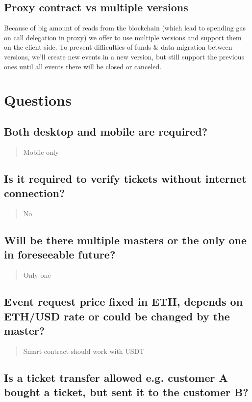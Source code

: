 \documentclass[11pt]{article}
\begin{document}
\subsection{Proxy contract vs multiple versions}
\label{sec:org36915b4}

Because of big amount of reads from the blockchain (which lead to spending gas on call delegation in proxy) we offer to use multiple versions and support them on the client side. To prevent difficulties of funds \& data migration between versions, we'll create new events in a new version, but still support the previous ones until all events there will be closed or canceled.
\section{Questions}
\label{sec:org047244f}

\subsection{Both desktop and mobile are required?}
\label{sec:org72f3a1a}

\begin{quote}
Mobile only
\end{quote}
\subsection{Is it required to verify tickets without internet connection?}
\label{sec:org835bd6b}

\begin{quote}
No
\end{quote}
\subsection{Will be there multiple masters or the only one in foreseeable future?}
\label{sec:org75abab5}

\begin{quote}
Only one
\end{quote}
\subsection{Event request price fixed in ETH, depends on ETH/USD rate or could be changed by the master?}
\label{sec:org17ca663}

\begin{quote}
Smart contract should work with USDT
\end{quote}
\subsection{Is a ticket transfer allowed e.g. customer A bought a ticket, but sent it to the customer B?}
\label{sec:org61553ee}
\end{document}
